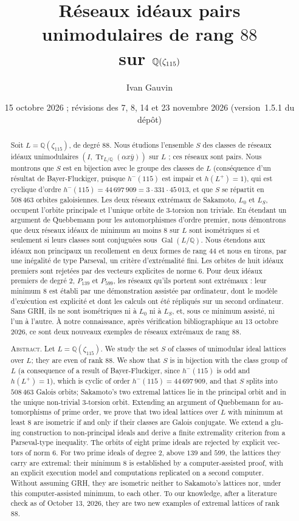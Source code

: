 \documentclass[11pt,a4paper]{amsart}
\title[Réseaux idéaux de rang 88 sur $\Q(\zeta_{115})$]{Réseaux idéaux pairs unimodulaires de rang $88$\\ sur $\Q(\zeta_{115})$}
\author{Ivan Gauvin}
\date{15 octobre 2026 ; révisions des 7, 8, 14 et 23 novembre 2026 (version~1.5.1 du dépôt)}
\theoremstyle{plain}
\theoremstyle{definition}
\numberwithin{equation}{section}
\newcommand{\Q}{\mathbb{Q}}
\DeclareMathOperator{\Tr}{Tr}
\DeclareMathOperator{\Gal}{Gal}
\newcommand{\Lz}{L_{0}}
\newcommand{\LS}{L_{S}}
\begin{document}
\begin{abstract}
Soit $L=\Q(\zeta_{115})$, de degré $88$. Nous étudions l'ensemble $S$ des classes de réseaux idéaux unimodulaires $(I,\Tr_{L/\Q}(\alpha x\bar y))$ sur $L$ ; ces réseaux sont pairs. Nous montrons que $S$ est en bijection avec le groupe des classes de $L$ (conséquence d'un résultat de Bayer-Fluckiger, puisque $h^-(115)$ est impair et $h(L^+)=1$), qui est cyclique d'ordre $h^-(115)=44\,697\,909=3\cdot331\cdot45\,013$, et que $S$ se répartit en $508\,463$ orbites galoisiennes. Les deux réseaux extrémaux de Sakamoto, $\Lz$ et $\LS$, occupent l'orbite principale et l'unique orbite de $3$-torsion non triviale. En étendant un argument de Quebbemann pour les automorphismes d'ordre premier, nous démontrons que deux réseaux idéaux de minimum au moins $8$ sur $L$ sont isométriques si et seulement si leurs classes sont conjuguées sous $\Gal(L/\Q)$. Nous étendons aux idéaux non principaux un recollement en deux formes de rang $44$ et nous en tirons, par une inégalité de type Parseval, un critère d'extrémalité fini. Les orbites de huit idéaux premiers sont rejetées par des vecteurs explicites de norme $6$. Pour deux idéaux premiers de degré $2$, $P_{139}$ et $P_{599}$, les réseaux qu'ils portent sont extrémaux : leur minimum $8$ est établi par une démonstration assistée par ordinateur, dont le modèle d'exécution est explicité et dont les calculs ont été répliqués sur un second ordinateur. Sans GRH, ils ne sont isométriques ni à $\Lz$ ni à $\LS$, et, sous ce minimum assisté, ni l'un à l'autre. À notre connaissance, après vérification bibliographique au 13 octobre 2026, ce sont deux nouveaux exemples de réseaux extrémaux de rang $88$.

\medskip
\noindent\textsc{Abstract.} \foreignlanguage{english}{Let $L=\Q(\zeta_{115})$. We study the set $S$ of classes of unimodular ideal lattices over $L$; they are even of rank $88$. We show that $S$ is in bijection with the class group of $L$ (a consequence of a result of Bayer-Fluckiger, since $h^-(115)$ is odd and $h(L^+)=1$), which is cyclic of order $h^-(115)=44\,697\,909$, and that $S$ splits into $508\,463$ Galois orbits; Sakamoto's two extremal lattices lie in the principal orbit and in the unique non-trivial $3$-torsion orbit. Extending an argument of Quebbemann for automorphisms of prime order, we prove that two ideal lattices over $L$ with minimum at least $8$ are isometric if and only if their classes are Galois conjugate. We extend a gluing construction to non-principal ideals and derive a finite extremality criterion from a Parseval-type inequality. The orbits of eight prime ideals are rejected by explicit vectors of norm $6$. For two prime ideals of degree $2$, above $139$ and $599$, the lattices they carry are extremal: their minimum $8$ is established by a computer-assisted proof, with an explicit execution model and computations replicated on a second computer. Without assuming GRH, they are isometric neither to Sakamoto's lattices nor, under this computer-assisted minimum, to each other. To our knowledge, after a literature check as of October 13, 2026, they are two new examples of extremal lattices of rank $88$.}
\end{abstract}
\end{document}
